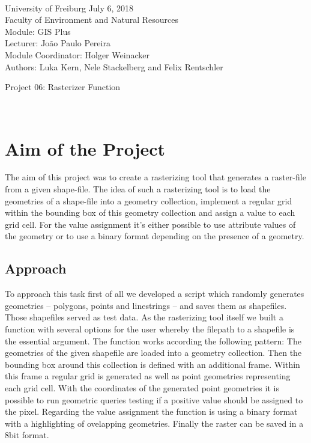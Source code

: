 \documentclass[10pt, a4paper]{article}
\begin{document}
	
	\markboth{}
	\\\noindent University of Freiburg \hspace{10cm}  July 6, 2018
	\\Faculty of Environment and Natural Resources
	\\Module: GIS Plus
	\\Lecturer: João Paulo Pereira
	\\Module Coordinator: Holger Weinacker
	\\Authors: Luka Kern, Nele Stackelberg and Felix Rentschler
	\\
	
	\begin{center}
		\huge{Project 06: Rasterizer Function} \vspace{0.5cm}\\
	\end{center}
	
	\
	\onehalfspacing %
	
	
	\section{Aim of the Project}
	The aim of this project was to create a rasterizing tool that generates a raster-file from a given shape-file. The idea of such a rasterizing tool is to load the geometries of a shape-file into a geometry collection, implement a regular grid within the bounding box of this geometry collection and assign a value to each grid cell. For the value assignment it's either possible to use attribute values of the geometry or to use a binary format depending on the presence of a geometry.
	
	\subsection*{Approach}
	To approach this task first of all we developed a script which randomly generates geometries -- polygons, points and linestrings -- and saves them as shapefiles. Those shapefiles served as test data. As the rasterizing tool itself we built a function with several options for the user whereby the filepath to a shapefile is the essential argument. The function works according the following pattern: The geometries of the given shapefile are loaded into a geometry collection. Then the bounding box around this collection is defined with an additional frame. Within this frame a regular grid is generated as well as point geometries representing each grid cell. With the coordinates of the generated point geometries it is possible to run geometric queries testing if a positive value should be assigned to the pixel. Regarding the value assignment the function is using a binary format with a 	highlighting of ovelapping geometries. Finally the raster can be saved in a 8bit format.
	
\end{document}
